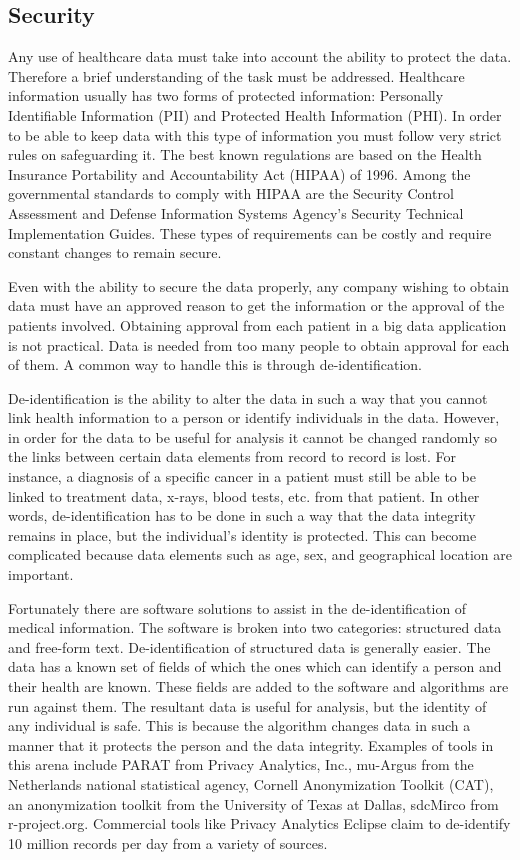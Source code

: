 \documentclass[sigconf]{acmart}
\begin{document}
\subsection{Security}
Any use of healthcare data must take into account the ability to 
protect the data.  Therefore a brief understanding of the task must 
be addressed. Healthcare information usually has two forms of 
protected information:  Personally Identifiable Information (PII) 
and Protected Health Information (PHI).  In order to be able to keep 
data with this type of information you must follow very strict rules 
on safeguarding it.  The best known regulations are based on the 
Health Insurance Portability and Accountability Act (HIPAA) of 1996.  
Among the governmental standards to comply with HIPAA are the 
Security Control Assessment\cite{CMS} and Defense Information Systems 
Agency's Security Technical Implementation Guides\cite{DISA}.  These 
types of requirements can be costly and require constant changes to 
remain secure.  

Even with the ability to secure the data properly, any company wishing 
to obtain data must have an approved reason to get the information or 
the approval of the patients involved.  Obtaining approval from each 
patient in a big data application is not practical.  Data is needed 
from too many people to obtain approval for each of them.  A common 
way to handle this is through de-identification.

De-identification is the ability to alter the data in such a way that 
you cannot link health information to a person or identify individuals 
in the data.  However, in order for the data to be useful for analysis 
it cannot be changed randomly so the links between certain data 
elements from record to record is lost.  For instance, a diagnosis of 
a specific cancer in a patient must still be able to be linked to 
treatment data, x-rays, blood tests, etc. from that patient.  In other 
words, de-identification has to be done in such a way that the data 
integrity remains in place, but the individual's identity is protected.  
This can become complicated because data elements such as age, sex, 
and geographical location are important.

Fortunately there are software solutions to assist in the 
de-identification of medical information.  The software is broken into 
two categories:  structured data and free-form text.  
De-identification of structured data is generally easier.  The data 
has a known set of fields of which the ones which can identify a person 
and their health are known.  These fields are added to the software and 
algorithms are run against them.  The resultant data is useful for 
analysis, but the identity of any individual is safe.  This is because 
the algorithm changes data in such a manner that it protects the person 
and the data integrity.  Examples of tools in this arena include PARAT 
from Privacy Analytics, Inc., mu-Argus from the Netherlands national 
statistical agency, Cornell Anonymization Toolkit (CAT), an anonymization 
toolkit from the University of Texas at Dallas, sdcMirco from 
r-project.org\cite{eHealthInfo}.  Commercial tools like Privacy Analytics 
Eclipse claim to de-identify 10 million records per day from a variety 
of sources\cite{PrivacyAnalytics}.
\end{document}

